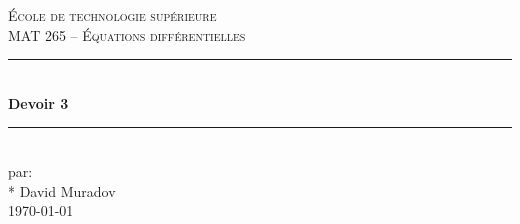 \documentclass[11pt, letterpaper]{article}
\begin{document}
\begin{titlepage}
\center

\vspace*{2cm}

\textsc{\LARGE École de technologie supérieure}\\[1cm]
\textsc{\Large MAT 265 -- Équations différentielles}\\[1.5cm]

\rule{\linewidth}{0.5mm} \\[0.5cm]
{\LARGE \bfseries Devoir 3} \\[0.2cm]
\rule{\linewidth}{0.5mm} \\[3cm]

\large par: \\*
David Muradov\\[8cm]


{\large \today }\\[3cm]

\vfill
\end{titlepage}



%
%
%
\end{document}
